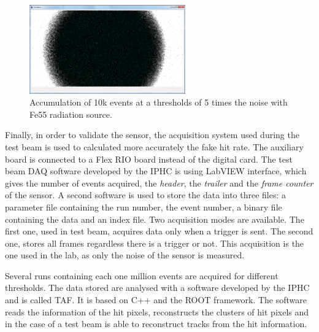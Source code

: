   \begin{figure}[!h]
    \centering
    \includegraphics[width=0.6\textwidth]{Pictures/labTests/10kEvents_Fe55_cut5sigma.png}
    \caption{Accumulation of 10k events at a thresholds of 5 times the noise with Fe55 radiation source.}
    \label{fig:fe55}
  \end{figure}

  Finally, in order to validate the sensor, the acquisition system used during the test beam is used to calculated more accurately the fake hit rate.
  The auxiliary board is connected to a  Flex RIO board instead of the digital card.
  The test beam DAQ software developed by the IPHC is using LabVIEW interface, which gives the number of events acquired, the \textit{header}, the \textit{trailer} and the \textit{frame counter} of the sensor.
  A second software is used to store the data into three files: a parameter file containing the run number, the event number, a binary file containing the data and an index file.
  Two acquisition modes are available. 
  The first one, used in test beam, acquires data only when a trigger is sent.
  The second one, stores all frames regardless there is a trigger or not. 
  This acquisition is the one used in the lab, as only the noise of the sensor is measured.
   
  Several runs containing each one million events are acquired for different thresholds. 
  The data stored are analysed with a software developed by the IPHC and is called \gls{TAF}.
  It is based on C++ and the ROOT framework.
  The software reads the information of the hit pixels, reconstructs the clusters of hit pixels and in the case of a test beam is able to reconstruct tracks from the hit information.

